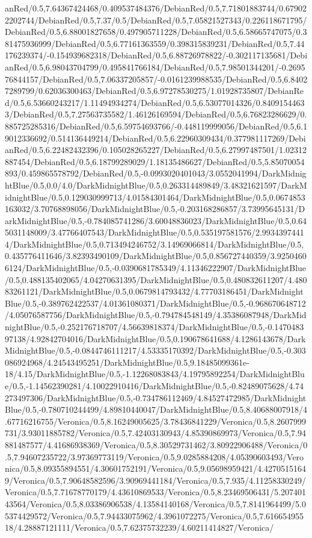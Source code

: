 {\begin{tikzternal}
anRed/0.5,7.64367424468/0.409537484376/DebianRed/0.5,7.71801883744/0.679022202744/DebianRed/0.5,7.37/0.5/DebianRed/0.5,7.05821527343/0.226118671795/DebianRed/0.5,6.88001827658/0.497905711228/DebianRed/0.5,6.58665747075/0.381475936999/DebianRed/0.5,6.77161363559/0.398315839231/DebianRed/0.5,7.44176239374/-0.154939682318/DebianRed/0.5,6.88726978822/-0.302117135681/DebianRed/0.5,6.98043704799/0.495841766184/DebianRed/0.5,7.98501344201/-0.269576844157/DebianRed/0.5,7.06337205857/-0.0161239988535/DebianRed/0.5,6.84027289799/0.62036300463/DebianRed/0.5,6.97278530275/1.01928735807/DebianRed/0.5,6.53660243217/1.11494934274/DebianRed/0.5,6.53077014326/0.84091544633/DebianRed/0.5,7.27563735582/1.46126169594/DebianRed/0.5,6.76823286629/0.885725285316/DebianRed/0.5,6.59754693766/-0.448119999056/DebianRed/0.5,6.19012336692/0.514136449214/DebianRed/0.5,6.22960309434/0.377981117269/DebianRed/0.5,6.22482432396/0.105028265227/DebianRed/0.5,6.27997487501/1.02312887454/DebianRed/0.5,6.18799289029/1.18135486627/DebianRed/0.5,5.85070054893/0.459865578792/DebianRed/0.5,-0.0993020401043/3.0552041994/DarkMidnightBlue/0.5,0.0/4.0/DarkMidnightBlue/0.5,0.263314489849/3.48321621597/DarkMidnightBlue/0.5,0.129030999713/4.01584301464/DarkMidnightBlue/0.5,0.0674853163032/3.70768898056/DarkMidnightBlue/0.5,-0.203168286857/3.73995645131/DarkMidnightBlue/0.5,-0.784085741286/3.60048836023/DarkMidnightBlue/0.5,0.645031148009/3.47766407543/DarkMidnightBlue/0.5,0.535197581576/2.99343974414/DarkMidnightBlue/0.5,0.713494246752/3.14969066814/DarkMidnightBlue/0.5,0.435776411646/3.82393490109/DarkMidnightBlue/0.5,0.856727440359/3.92504606124/DarkMidnightBlue/0.5,-0.0390681785349/4.11346222907/DarkMidnightBlue/0.5,0.488135402065/4.04270631395/DarkMidnightBlue/0.5,0.480832611207/4.48083261121/DarkMidnightBlue/0.5,0.0679814793432/4.77703186451/DarkMidnightBlue/0.5,-0.389762422537/4.01361080371/DarkMidnightBlue/0.5,-0.968670648712/4.05076587756/DarkMidnightBlue/0.5,-0.794784548149/4.35386087948/DarkMidnightBlue/0.5,-0.252176718707/4.56639818374/DarkMidnightBlue/0.5,-0.147048397138/4.92842704016/DarkMidnightBlue/0.5,0.190678641688/4.1286143678/DarkMidnightBlue/0.5,-0.0844746111217/4.53335170392/DarkMidnightBlue/0.5,-0.303086924968/4.24543495251/DarkMidnightBlue/0.5,9.18485099361e-18/4.15/DarkMidnightBlue/0.5,-1.12268083843/4.19795892254/DarkMidnightBlue/0.5,-1.14562390281/4.10022910416/DarkMidnightBlue/0.5,-0.82489075628/4.74273497306/DarkMidnightBlue/0.5,-0.734786112469/4.84527472985/DarkMidnightBlue/0.5,-0.780710244499/4.89810440047/DarkMidnightBlue/0.5,8.40688007918/4.67716216755/Veronica/0.5,8.16249005625/3.78436841229/Veronica/0.5,8.2607999731/3.93011885782/Veronica/0.5,7.42403130943/4.85390869973/Veronica/0.5,7.94881487577/4.41686938369/Veronica/0.5,8.30529731462/3.80922906488/Veronica/0.5,7.94607235722/3.97369773119/Veronica/0.5,9.0285884208/4.05390603493/Veronica/0.5,8.09355894551/4.30601752191/Veronica/0.5,9.05698959421/4.42705151649/Veronica/0.5,7.90648582596/3.90969441184/Veronica/0.5,7.935/4.11258330249/Veronica/0.5,7.71678770179/4.43610869533/Veronica/0.5,8.23469506431/5.20740143564/Veronica/0.5,8.03386906538/4.13584140168/Veronica/0.5,7.8141964499/5.05374429572/Veronica/0.5,7.94433075962/4.3961072275/Veronica/0.5,7.61665495518/4.28887121111/Veronica/0.5,7.62375732239/4.60211414827/Veronica/
\end{tikzternal}}
